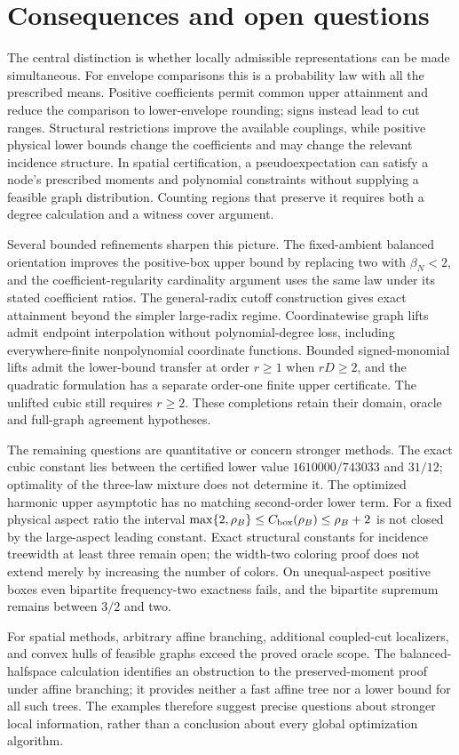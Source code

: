 \section{Consequences and open questions}\label{sec:synthesis}
The central distinction is whether locally admissible representations can
be made simultaneous. For envelope comparisons this is a probability law
with all the prescribed means. Positive coefficients permit common upper
attainment and reduce the comparison to lower-envelope rounding; signs
instead lead to cut ranges. Structural restrictions improve the available
couplings, while positive physical lower bounds change the coefficients
and may change the relevant incidence structure. In spatial certification,
a pseudoexpectation can satisfy a node's prescribed moments and polynomial
constraints without supplying a feasible graph distribution. Counting
regions that preserve it requires both a degree calculation and a witness
cover argument.

Several bounded refinements sharpen this picture. The fixed-ambient
balanced orientation improves the positive-box upper bound by replacing
two with $\beta_N<2$, and the coefficient-regularity cardinality argument
uses the same law under its stated coefficient ratios. The general-radix
cutoff construction gives exact attainment beyond the simpler large-radix
regime. Coordinatewise graph lifts admit endpoint interpolation without
polynomial-degree loss, including everywhere-finite nonpolynomial
coordinate functions. Bounded signed-monomial lifts admit the lower-bound
transfer at order $r\ge1$ when $rD\ge2$, and the quadratic formulation has
a separate order-one finite upper certificate. The unlifted cubic still
requires $r\ge2$. These completions retain their domain, oracle and
full-graph agreement hypotheses.

The remaining questions are quantitative or concern stronger methods.
The exact cubic constant lies between the certified lower value
$1610000/743033$ and $31/12$; optimality of the three-law mixture does not
determine it. The optimized harmonic upper asymptotic has no matching
second-order lower term. For a fixed physical aspect ratio the interval
$\max\{2,\rho_B\}\le C_{\rm box}(\rho_B)\le\rho_B+2$ is not closed by
the large-aspect leading constant. Exact structural constants for incidence
treewidth at least three remain open; the width-two coloring proof does
not extend merely by increasing the number of colors. On unequal-aspect
positive boxes even bipartite frequency-two exactness fails, and the
bipartite supremum remains between $3/2$ and two.

For spatial methods, arbitrary affine branching, additional coupled-cut
localizers, and convex hulls of feasible graphs exceed the proved oracle
scope. The balanced-halfspace calculation identifies an obstruction to the
preserved-moment proof under affine branching; it provides neither a fast
affine tree nor a lower bound for all such trees. The examples therefore
suggest precise questions about stronger local information, rather than
a conclusion about every global optimization algorithm.
